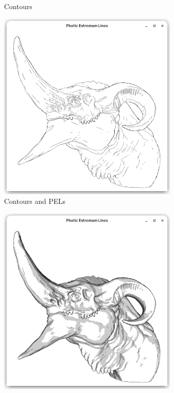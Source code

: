 \documentclass[9pt,fleqn,twoside,twocolumn]{stdglobal}
\begin{document}
\begin{figure}[h]
\begin{subfigure}[b]{0.24\textwidth}
        \caption{Contours}
      \end{subfigure}%
      \hfill%
      \begin{subfigure}[b]{0.24\textwidth}
        \centering
        \includegraphics[width=0.95\textwidth,trim={15px 15 15 50},clip]{images/dragon-head-contour-pel-shader.png}
        \caption{Contours and PELs}
      \end{subfigure}%
      \hfill
      \begin{subfigure}[b]{0.24\textwidth}
        \centering
        \includegraphics[width=0.95\textwidth,trim={15px 15 15 50},clip]{images/dragon-head-contour-pel-toon-shader.png}

\end{subfigure}
\end{figure}
\end{document}
